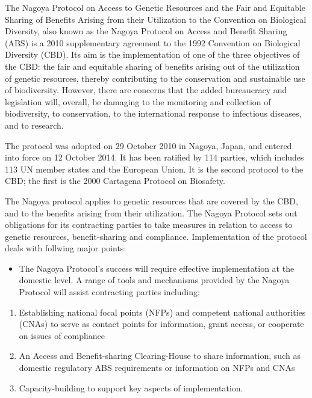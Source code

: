 \documentclass[
  openany]{book}
\providecommand{\tightlist}{%
  \setlength{\itemsep}{0pt}\setlength{\parskip}{0pt}}
\begin{document}
The Nagoya Protocol on Access to Genetic Resources and the Fair and Equitable Sharing of Benefits Arising from their Utilization to the Convention on Biological Diversity, also known as the Nagoya Protocol on Access and Benefit Sharing (ABS) is a 2010 supplementary agreement to the 1992 Convention on Biological Diversity (CBD). Its aim is the implementation of one of the three objectives of the CBD: the fair and equitable sharing of benefits arising out of the utilization of genetic resources, thereby contributing to the conservation and sustainable use of biodiversity. However, there are concerns that the added bureaucracy and legislation will, overall, be damaging to the monitoring and collection of biodiversity, to conservation, to the international response to infectious diseases, and to research.

The protocol was adopted on 29 October 2010 in Nagoya, Japan, and entered into force on 12 October 2014. It has been ratified by 114 parties, which includes 113 UN member states and the European Union. It is the second protocol to the CBD; the first is the 2000 Cartagena Protocol on Biosafety.

The Nagoya protocol applies to genetic resources that are covered by the CBD, and to the benefits arising from their utilization. The Nagoya Protocol sets out obligations for its contracting parties to take measures in relation to access to genetic resources, benefit-sharing and compliance. Implementation of the protocol deals with follwing major points:

\begin{itemize}
\tightlist
\item
  The Nagoya Protocol's success will require effective implementation at the domestic level. A range of tools and mechanisms provided by the Nagoya Protocol will assist contracting parties including:
\end{itemize}

\begin{enumerate}
\def\labelenumi{\arabic{enumi}.}
\tightlist
\item
  Establishing national focal points (NFPs) and competent national authorities (CNAs) to serve as contact points for information, grant access, or cooperate on issues of compliance
\item
  An Access and Benefit-sharing Clearing-House to share information, such as domestic regulatory ABS requirements or information on NFPs and CNAs
\item
  Capacity-building to support key aspects of implementation.
\end{enumerate}
\end{document}
